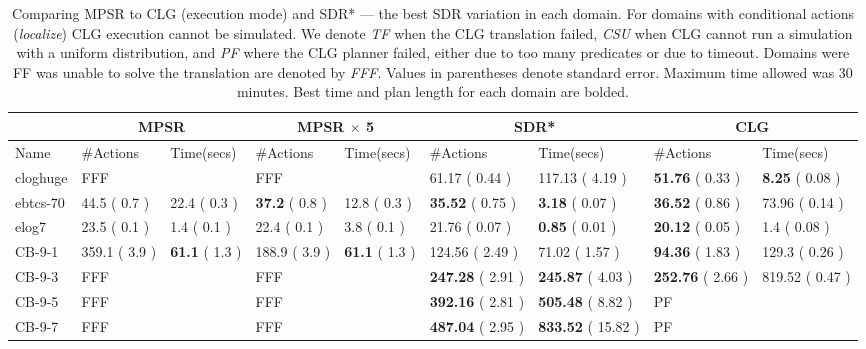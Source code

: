 \documentclass[letterpaper]{article}
\numberwithin{equation}{section}	%
\begin{document}
\begin{table}[htb]
\centering
\caption{
\footnotesize
Comparing MPSR to CLG (execution mode) and SDR* --- the best SDR variation in each domain. For domains with conditional actions (\emph{localize}) CLG execution cannot be simulated. We denote {\em TF} when the CLG translation failed, {\em CSU} when CLG  cannot run a simulation with a uniform distribution, and {\em PF} where the CLG planner failed, either due to too many predicates or due to timeout. Domains were FF was unable to solve the translation are denoted by {\em FFF}. Values in parentheses denote standard error. Maximum time allowed was 30 minutes. Best time and plan length for each domain are bolded.
}
\scriptsize
\begin{tabular}{|l||l|l||l|l||l|l||l|l|}
\hline
	&\multicolumn{2}{c||}{MPSR}&\multicolumn{2}{c||}{MPSR $\times$ 5}&\multicolumn{2}{c|}{SDR*}&\multicolumn{2}{c|}{CLG}\\\hline
Name	&	\#Actions			&	Time(secs)			&	\#Actions			&	Time(secs)			&	\#Actions			&	Time(secs)			 &	\#Actions		 &		Time(secs)		\\ \hline
cloghuge	&		FFF&		&		FFF		&		&		61.17	(	0.44	)&	117.13	(	4.19	)&		\textbf{51.76}	(	0.33	)&	\textbf{8.25}	(	 0.08	 )\\
ebtcs-70	&	44.5	(	0.7	)&	22.4	(	0.3	)&			\textbf{37.2}	(	0.8	)&	12.8	(	0.3	)&		\textbf{35.52}	(	0.75	)&	\textbf{3.18}	(	 0.07	)&		\textbf{36.52}	 (	0.86	)&	73.96	(	0.14	 )\\
elog7	&	23.5	(	0.1	)&	1.4	(	0.1	)&			22.4	(	0.1	)&	3.8	(	0.1	)&		21.76	(	0.07	)&	\textbf{0.85}	(	0.01	)&		\textbf{20.12}	 (	0.05	)&	1.4	(	0.08	 )\\
\hline
	
CB-9-1	&	359.1	(	3.9	)&	\textbf{61.1}	(	1.3	)&			188.9	(	3.9	)&	\textbf{61.1}	(	1.3	)&		124.56	(	2.49	)&	71.02	(	1.57	)&		 \textbf{94.36}	(	1.83	 )&	129.3	(	0.26	 )\\
CB-9-3	&		FFF&		&				FFF&		&		\textbf{247.28}	(	2.91	)&	\textbf{245.87}	(	4.03	)&		\textbf{252.76}	(	2.66	)&	819.52	 (	0.47	)\\
CB-9-5	&		FFF&		&				FFF&		&		\textbf{392.16}	(	2.81	)&	\textbf{505.48}	(	8.82	)&		PF			&				\\
CB-9-7	&		FFF&		&				FFF&		&		\textbf{487.04}	(	2.95	)&	\textbf{833.52}	(	15.82	)&		PF			&				\\
\hline
																																					

\end{tabular}
\end{table}
\end{document}
